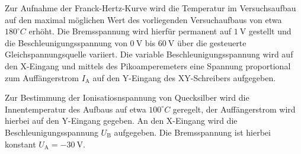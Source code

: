 Zur Aufnahme der Franck-Hertz-Kurve wird die Temperatur im Versuchsaufbau auf den maximal möglichen Wert des vorliegenden Versuchaufbaus von etwa $180^\circ C$ erhöht. Die Bremsspannung wird hierfür permanent auf $\SI{1}{\volt}$ gestellt und die Beschleunigungsspannung von $\SI{0}{\volt}$ bis $\SI{60}{\volt}$ über die gesteuerte Gleichspannungsquelle variiert.
Die variable Beschleunigungsspannung wird auf den X-Eingang und mittels des Pikoamperemeters eine Spannung proportional zum Auffängerstrom $I_\mathrm{A}$ auf den Y-Eingang des XY-Schreibers aufgegeben.

Zur Bestimmung der Ionisatiosnspannung von Quecksilber wird die Innentemperatur des Aufbaus auf etwa $100^\circ C$ geregelt, der Auffängerstrom wird hierbei auf den Y-Eingang gegeben.
An den X-Eingang wird die Beschleunigungsspannung $U_\mathrm{B}$ aufgegeben. Die Bremsspannung ist hierbei konstant $U_\mathrm{A}=\SI{-30}{\volt}$.
